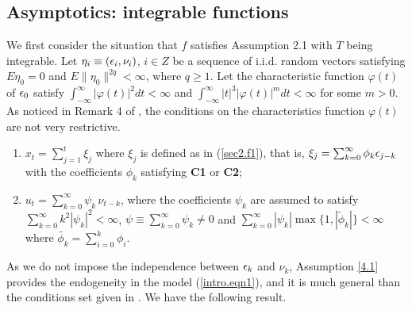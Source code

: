 \subsection{Asymptotics: integrable functions} 

We first consider the situation that $f$ satisfies Assumption 2.1 with $T$
being integrable.  Let $\eta_i\equiv (\epsilon_i, \nu_i)$, $i\in Z$ be a sequence of i.i.d. random vectors satisfying $E\eta_0=0$ and $E\|\eta_0\|^{2q}<\infty$,
 where $q \ge 1$. Let the characteristic function $\varphi(t)$ of $\epsilon_0$ satisfy $\int_{-\infty}^{\infty} | \varphi(t)|^2 dt < \infty$ and $\int_{-\infty}^{\infty} |t|^3 |\varphi(t)|^m dt < \infty$ for some $m > 0$. As noticed in Remark 4 of \cite{jaganathan2008}, the conditions on the characteristics function $\varphi(t)$ are not very restrictive.



\begin{assump}
\begin{enumerate}[label=(\roman{*}), leftmargin=*, widest=0] \itemsep0pt \parskip0pt 
\item $x_t=\sum_{j=1}^t\xi_j$ where $\xi_j$ is defined as in (\ref {sec2.f1}), that is, $\xi_j=\sum_{k=0}^{\infty}\phi_k\epsilon_{j-k}$ with the coefficients $\phi_k$ satisfying {\bf C1} or {\bf C2};

\item $u_t= \sum_{k=0}^{\infty}\psi_k\, \nu_{t-k}$, where the coefficients $\psi_k$ are assumed to satisfy  $\sum_{k=0}^{\infty}k^2 |\psi_k|^2<\infty$, $ \psi \equiv \sum_{k=0}^{\infty}\psi_k\not= 0$ and $\sum_{k=0}^{\infty} |\psi_k| \max\{1, |\tilde{\phi}_k|\}< \infty$ where $\tilde{\phi_k} = \sum_{i = 0}^k \phi_i$.
\end{enumerate}
\end{assump}


As we do not impose the independence between $\epsilon_k$ and $\nu_k$, Assumption \ref {4.1} provides the endogeneity in the model (\ref {intro.eqn1}), and it is much general than the conditions set given in \cite{changpark2010}.
We have the following result.

